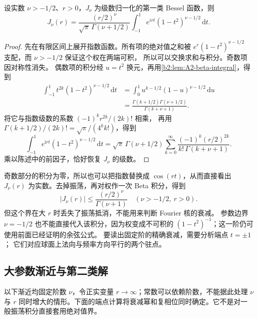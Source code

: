 \begin{proposition}
\label{b2:prop:A2-poisson-bessel}
设实数 \(\nu>-1/2\)、\(r>0\)，\(J_\nu\) 为级数归一化的第一类 Bessel 函数，则
\[
 J_\nu(r)=\frac{(r/2)^\nu}{\sqrt\pi\,\Gamma(\nu+1/2)}
       \int_{-1}^1e^{irt}(1-t^2)^{\nu-1/2}\,\mathrm dt.
\]
\end{proposition}
\begin{proof}
先在有限区间上展开指数函数。所有项的绝对值之和被
\(e^r(1-t^2)^{\nu-1/2}\) 支配，而 \(\nu>-1/2\) 保证这个权在两端可积，
所以可以交换求和与积分。奇数项因对称性消失。
偶数项的积分经 \(u=t^2\) 换元，再用\cref{b2:lem:A2-beta-integral}，得到
\[
 \begin{aligned}
 \int_{-1}^1t^{2k}(1-t^2)^{\nu-1/2}\,\mathrm dt
 &=\int_0^1u^{k-1/2}(1-u)^{\nu-1/2}\,\mathrm du\\
 &=\frac{\Gamma(k+1/2)\Gamma(\nu+1/2)}
 {\Gamma(k+\nu+1)}.
 \end{aligned}
\]
将它与指数级数的系数 \((-1)^kr^{2k}/(2k)!\) 相乘，
再用 \(\Gamma(k+1/2)/(2k)!=\sqrt\pi/(4^kk!)\)，得到
\[
 \int_{-1}^1e^{\mathrm irt}(1-t^2)^{\nu-1/2}\,\mathrm dt
 =\sqrt\pi\,\Gamma(\nu+1/2)
 \sum_{k=0}^\infty
 \frac{(-1)^k(r/2)^{2k}}{k!\,\Gamma(k+\nu+1)}.
\]
乘以陈述中的前因子，恰好恢复 \(J_\nu\) 的级数。
\end{proof}

奇数部分的积分为零，所以也可以把指数替换成 \(\cos(rt)\)，从而直接看出
\(J_\nu(r)\) 为实数。去掉振荡，再对权作一次 Beta 积分，得到
\[
 |J_\nu(r)|\leq\frac{(r/2)^\nu}{\Gamma(\nu+1)}
 \quad(\nu>-1/2,\ r>0).
\]
但这个界在大 \(r\) 时丢失了振荡抵消，不能用来判断 Fourier 核的衰减。
参数边界 \(\nu=-1/2\) 也不能直接代入该积分，因为权变成不可积的
\((1-t^2)^{-1}\)；这一阶仍可使用前面已经证明的余弦公式。
要读出固定阶的精确衰减，需要分析端点 \(t=\pm1\)；
它们对应球面上法向与频率方向平行的两个驻点。

\subsection{大参数渐近与第二类解}
\label{b2:subsec:A20103}

以下渐近均固定阶数 \(\nu\)，令正实变量 \(r\to\infty\)；常数可以依赖阶数，不能据此处理 \(\nu\) 与 \(r\) 同时增大的情形。下面的端点计算将衰减幂和复相位同时确定。它不是对一般振荡积分直接套用绝对值界。

